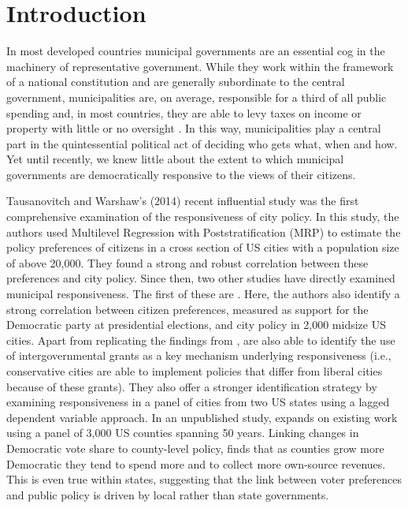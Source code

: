 \documentclass[a4paper,12pt]{article}
\begin{document}
\section{Introduction}

In most developed countries municipal governments are an essential cog in the machinery of representative government. While they work within the framework of a national constitution and are generally subordinate to the central government, municipalities are, on average, responsible for a third of all public spending and, in most countries, they are able to levy taxes on income or property with little or no oversight \citep{oecd2016subnational}. In this way, municipalities play a central part in the quintessential political act of deciding who gets what, when and how.  Yet until recently, we knew little about the extent to which municipal governments are democratically responsive to the views of their citizens.


Tausanovitch and Warshaw's (2014) recent influential study  was the first comprehensive examination of the responsiveness of city policy. In this study, the authors used Multilevel Regression with Poststratification (MRP) to estimate the policy preferences of citizens in a cross section of US cities with a population size of above 20,000. They found a strong and robust correlation between these preferences and city policy. Since then, two other studies have directly examined municipal responsiveness. The first of these are \cite{einstein2016pushing}. Here, the authors also identify a strong correlation between citizen preferences, measured as support for the Democratic party at presidential elections,  and city policy in 2,000 midsize US cities. Apart from replicating the findings from \citeauthor{tausanovitch2014representation}, \citeauthor{einstein2016pushing} are also able to identify the use of intergovernmental grants as a key mechanism underlying responsiveness (i.e., conservative cities are able to implement policies that differ from liberal cities because of these grants). They also offer a stronger identification strategy by examining responsiveness in a panel of cities from two US states using a lagged dependent variable approach. In an unpublished study, \cite{sances2017voters} expands on existing work using a panel of 3,000 US counties spanning 50 years. Linking changes in Democratic vote share to county-level policy, \citeauthor{sances2017voters} finds that as counties grow more Democratic they tend to spend more and to collect more own-source revenues. This is even true within states, suggesting that the link between voter preferences and public policy is driven by local rather than state governments.
\end{document}
